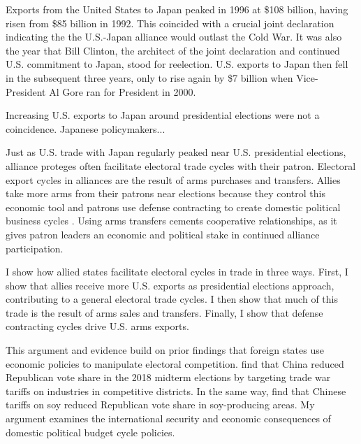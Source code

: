 \documentclass[12pt]{article}
\begin{document}
Exports from the United States to Japan peaked in 1996 at \$108 billion, having risen from \$85 billion in 1992.
This coincided with a crucial joint declaration indicating the the U.S.-Japan alliance would outlast the Cold War. 
It was also the year that Bill Clinton, the architect of the joint declaration and continued U.S. commitment to Japan, stood for reelection. 
U.S. exports to Japan then fell in the subsequent three years, only to rise again by \$7 billion when Vice-President Al Gore ran for President in 2000. 


Increasing U.S. exports to Japan around presidential elections were not a coincidence. 
Japanese policymakers... 


Just as U.S. trade with Japan regularly peaked near U.S. presidential elections, alliance proteges often facilitate electoral trade cycles with their patron.
Electoral export cycles in alliances are the result of arms purchases and transfers. 
Allies take more arms from their patrons near elections because they control this economic tool and patrons use defense contracting to create domestic political business cycles \citep{Tufte1978, Mintz1988, Mayer1995, DerouenHeo2000}. 
Using arms transfers cements cooperative relationships, as it gives patron leaders an economic and political stake in continued alliance participation.


I show how allied states facilitate electoral cycles in trade in three ways. 
First, I show that allies receive more U.S. exports as presidential elections approach, contributing to a general electoral trade cycles.
I then show that much of this trade is the result of arms sales and transfers.  
Finally, I show that defense contracting cycles drive U.S. arms exports. 


This argument and evidence build on prior findings that foreign states use economic policies to manipulate electoral competition. 
\citet{KimMargalit2021} find that China reduced Republican vote share in the 2018 midterm elections by targeting trade war tariffs on industries in competitive districts.
In the same way, \cite{ChyzhUrbatsch2021} find that Chinese tariffs on soy reduced Republican vote share in soy-producing areas. 
My argument examines the international security and economic consequences of domestic political budget cycle policies.
\end{document}
